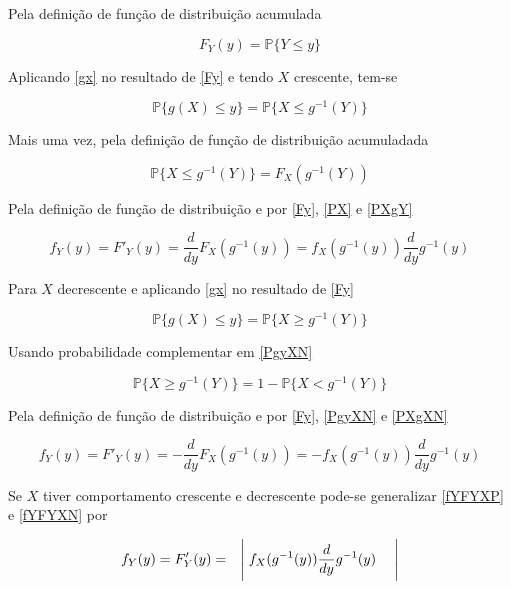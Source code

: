 \documentclass{article}
\begin{document}
Pela definição de função de distribuição acumulada

\begin{equation}
F_Y(y)  = \mathbb{P}\{Y \leq y\}
\label{Fy}
\end{equation}

Aplicando \ref{gx} no resultado de \ref{Fy} e tendo $X$ crescente, tem-se

\begin{equation}
\mathbb{P}\{g(X) \leq y\} = \mathbb{P}\{X \leq g^{-1}(Y)\}
\label{PX}
\end{equation}

Mais uma vez, pela definição de função de distribuição acumuladada

\begin{equation}
\mathbb{P}\{X \leq g^{-1}(Y)\} = F_X(g^{-1}(Y))
\label{PXgY}
\end{equation}

Pela definição de função de distribuição e por \ref{Fy}, \ref{PX} e \ref{PXgY}

\begin{equation}
f_Y(y) = F'_Y(y) = \frac{d}{dy}F_X(g^{-1}(y)) = f_X(g^{-1}(y))\frac{d}{dy}g^{-1}(y)
\label{fYFYXP}
\end{equation}

Para $X$ decrescente e aplicando \ref{gx} no resultado de \ref{Fy}

\begin{equation}
\mathbb{P}\{g(X) \leq y\} = \mathbb{P}\{X \geq g^{-1}(Y)\}
\label{PgyXN}
\end{equation}

Usando probabilidade complementar em \ref{PgyXN}

\begin{equation}
\mathbb{P}\{X \geq g^{-1}(Y)\} = 1 - \mathbb{P}\{X < g^{-1}(Y)\}
\label{PXgXN}
\end{equation}

Pela definição de função de distribuição e por \ref{Fy}, \ref{PgyXN} e \ref{PXgXN}

\begin{equation}
f_Y(y) = F'_Y(y) = -\frac{d}{dy}F_X(g^{-1}(y)) = -f_X(g^{-1}(y))\frac{d}{dy}g^{-1}(y)
\label{fYFYXN}
\end{equation}

Se $X$ tiver comportamento crescente e decrescente pode-se generalizar \ref{fYFYXP} e \ref{fYFYXN} por

\begin{equation}
f_Y(y) = F'_Y(y) =  \quad\Biggm\lvert f_X(g^{-1}(y))\frac{d}{dy}g^{-1}(y)\quad\Biggm\lvert
\label{fYFYmodulo}
\end{equation}
\end{document}
